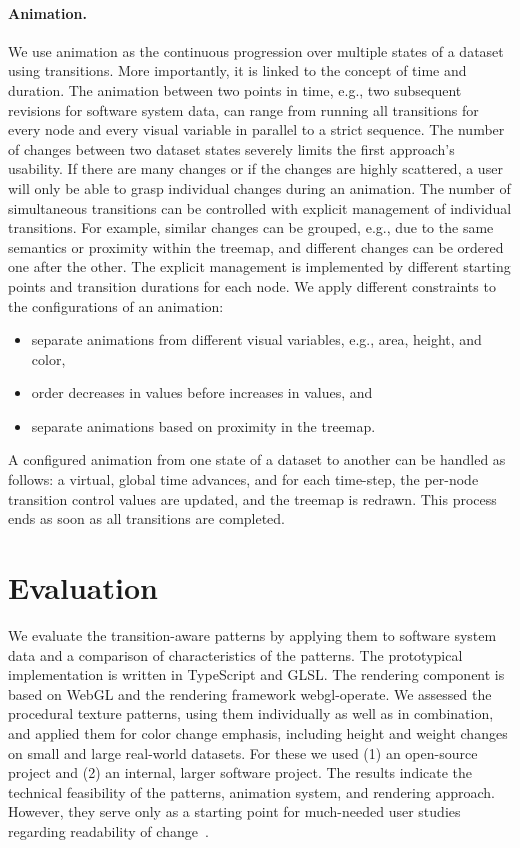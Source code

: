 \documentclass[smallextended,natbib]{svjour3}       %
\begin{document}
\paragraph{Animation.}
We use animation as the continuous progression over multiple states of a dataset using transitions.
More importantly, it is linked to the concept of time and duration.
The animation between two points in time, e.g., two subsequent revisions for software system data, can range from running all transitions for every node and every visual variable in parallel to a strict sequence.
The number of changes between two dataset states severely limits the first approach's usability.
If there are many changes or if the changes are highly scattered, a user will only be able to grasp individual changes during an animation.
The number of simultaneous transitions can be controlled with explicit management of individual transitions. For example, similar changes can be grouped, e.g., due to the same semantics or proximity within the treemap, and different changes can be ordered one after the other.
The explicit management is implemented by different starting points and transition durations for each node.
We apply different constraints to the configurations of an animation:
\begin{itemize}
    \item separate animations from different visual variables, e.g., area, height, and color,
    \item order decreases in values before increases in values, and
    \item separate animations based on proximity in the treemap.
\end{itemize}%
A configured animation from one state of a dataset to another can be handled as follows: a virtual, global time advances, and for each time-step, the per-node transition control values are updated, and the treemap is redrawn. 
This process ends as soon as all transitions are completed.

\section{Evaluation}
\label{sec:evaluation}
We evaluate the transition-aware patterns by applying them to software system data and a comparison of characteristics of the patterns.
The prototypical implementation is written in TypeScript and GLSL. The rendering component is based on WebGL and the rendering framework webgl-operate.
We assessed the procedural texture patterns, using them individually as well as in combination, and applied them for color change emphasis, including height and weight changes on small and large real-world datasets.
For these we used (1) an open-source project and (2) an internal, larger software project.
The results indicate the technical feasibility of the patterns, animation system, and rendering approach. However, they serve only as a starting point for much-needed user studies regarding readability of change~\citep{fiedler2020-treemapevaluation}.
\end{document}
